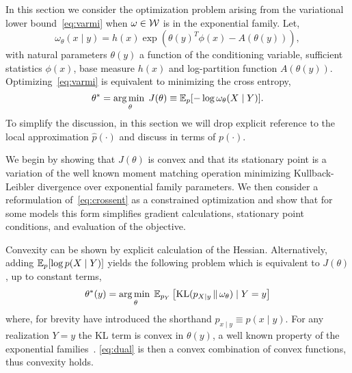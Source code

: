 In this section we consider the optimization problem arising from the
variational lower bound~\eqref{eq:varmi} when $\omega \in \mathcal{W}$ is in
the exponential family.  Let,
\begin{equation}
  \omega_\theta(x \mid y) = h(x)\exp\left( \theta(y)^T \phi(x) - A(\theta(y)) \right),
\end{equation}
with natural parameters $\theta(y)$ a function of the conditioning
variable, sufficient statistics $\phi(x)$, base measure $h(x)$ and
log-partition function $A(\theta(y))$.  Optimizing~\eqref{eq:varmi} is
equivalent to minimizing the cross entropy,
\begin{equation}\label{eq:crossent}
  \theta^{*} = \operatorname*{arg\,min\;}_{\theta} J(\theta) \equiv \mathbb{E}_p[ - \log \omega_{\theta}(X \mid Y) ].
\end{equation}
To simplify the discussion, in this section we will drop explicit
reference to the local approximation $\hat{p}(\cdot)$ and discuss in
terms of $p(\cdot)$.

We begin by showing that $J(\theta)$ is convex and that its stationary
point is a variation of the well known moment matching operation
minimizing Kullback-Leibler divergence over exponential family
parameters.  We then consider a reformulation of~\eqref{eq:crossent}
as a constrained optimization and show that for some models this form
simplifies gradient calculations, stationary point conditions, and
evaluation of the objective.

Convexity can be shown by explicit calculation of the Hessian.
Alternatively, adding \mbox{$\mathbb{E}_p[ \log p(X \mid Y) ]$} yields the
following problem which is equivalent to $J(\theta)$, up to constant
terms,
\begin{equation}\label{eq:dual}
  \theta^*(y) = \operatorname*{arg\,min\;}_\theta \mathbb{E}_{p_Y}\left[ \mathrm{KL}(p_{X\mid y}\,\|\,\omega_\theta) \mid Y=y \right]
\end{equation}
where, for brevity have introduced the shorthand $p_{x\mid y} \equiv
p(x\mid y)$.  For any realization $Y=y$ the KL term is convex in
$\theta(y)$, a well known property of the exponential
families~\citep{wainwright_jordan}.  \EQN\eqref{eq:dual} is then a
convex combination of convex functions, thus convexity holds.

